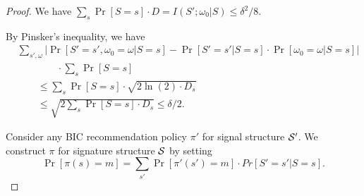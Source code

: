 \begin{proof}
We have
$\sum_{s} \Pr[S=s] \cdot D = I(S' ; \omega_0|S) \leq \delta^2/8$.

By Pinsker's inequality, we have
\begin{align*}
& \sum_{s', \omega} \left| \Pr[S' = s', \omega_0 = \omega| S= s] - \Pr[S'=s'|S=s] \cdot \Pr[\omega_0 = \omega|S=s]\right| \\
       &\qquad\qquad\cdot \sum_{s} \Pr[S = s] \\
&\qquad\leq\textstyle  \sum_{s} \Pr[S=s] \cdot \sqrt{2 \ln(2)\cdot D_s  } \\
&\qquad\leq\textstyle   \sqrt{2 \sum_{s} \Pr[S=s] \cdot  D_s }
\leq  \delta /2.
\end{align*}

Consider any BIC recommendation policy $\pi'$ for signal structure $\S'$. We construct $\pi$ for signature structure $\S$ by setting
\[ \textstyle \Pr[\pi(s) = m] = \sum_{s'} \Pr[\pi'(s') = m] \cdot Pr[S' = s'|S = s].\]


\end{proof}
